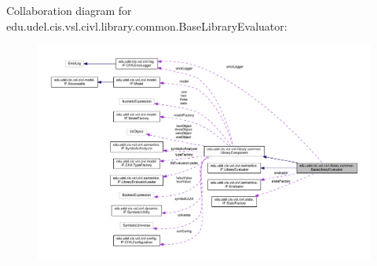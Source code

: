 Collaboration diagram for edu.\+udel.\+cis.\+vsl.\+civl.\+library.\+common.\+Base\+Library\+Evaluator\+:
\nopagebreak
\begin{figure}[H]
\begin{center}
\leavevmode
\includegraphics[width=350pt]{classedu_1_1udel_1_1cis_1_1vsl_1_1civl_1_1library_1_1common_1_1BaseLibraryEvaluator__coll__graph}
\end{center}
\end{figure}
